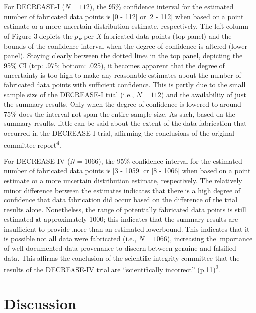 \documentclass[]{article}
\begin{document}
For DECREASE-I (\(N=112\)), the 95\% confidence interval for the
estimated number of fabricated data points is {[}0 - 112{]} or {[}2 -
112{]} when based on a point estimate or a more uncertain distribution
estimate, respectively. The left column of Figure 3 depicts the \(p_F\)
per \emph{X} fabricated data points (top panel) and the bounds of the
confidence interval when the degree of confidence is altered (lower
panel). Staying clearly between the dotted lines in the top panel,
depicting the 95\% CI (top: .975; bottom: .025), it becomes apparent
that the degree of uncertainty is too high to make any reasonable
estimates about the number of fabricated data points with sufficient
confidence. This is partly due to the small sample size of the
DECREASE-I trial (i.e., \(N=112\)) and the availability of just the
summary results. Only when the degree of confidence is lowered to around
75\% does the interval not span the entire sample size. As such, based
on the summary results, little can be said about the extent of the data
fabrication that occurred in the DECREASE-I trial, affirming the
conclusions of the original committee report\textsuperscript{4}.

For DECREASE-IV (\(N=1066\)), the 95\% confidence interval for the
estimated number of fabricated data points is {[}3 - 1059{]} or {[}8 -
1066{]} when based on a point estimate or a more uncertain distribution
estimate, respectively. The relatively minor difference between the
estimates indicates that there is a high degree of confidence that data
fabrication did occur based on the difference of the trial results
alone. Nonetheless, the range of potentially fabricated data points is
still estimated at approximately 1000; this indicates that the summary
results are insufficient to provide more than an estimated lowerbound.
This indicates that it is possible not all data were fabricated (i.e.,
\(N=1066\)), increasing the importance of well-documented data
provenance to discern between genuine and falsified data. This affirms
the conclusion of the scientific integrity committee that the results of
the DECREASE-IV trial are ``scientifically incorrect''
(p.11)\textsuperscript{3}.

\section{Discussion}\label{discussion}
\end{document}
